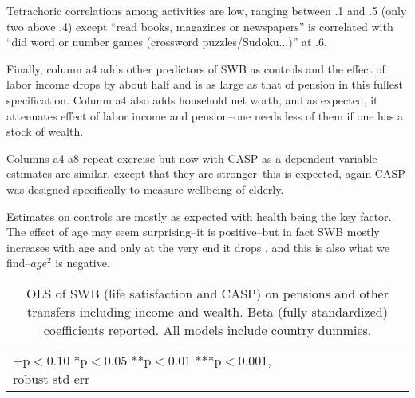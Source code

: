 \documentclass[10pt, letterpaper]{article}
\begin{document}
\begin{spacing}{1.4}
Tetrachoric correlations among activities are low, ranging between .1 and .5
(only two above .4) except ``read books, magazines or newspapers'' is
correlated with ``did word or number games (crossword puzzles/Sudoku...)'' at .6.

Finally, column a4 adds other predictors of SWB as controls and the effect of labor income drops by
about half
and is as large as that of pension in this fullest specification. Column a4 also adds household net
worth, and as expected, it attenuates effect of labor income and pension--one
needs less of them if one has a stock of wealth. 
%

Columns a4-a8 repeat exercise but now with CASP as a dependent
variable--estimates are similar, except that they are
stronger--this is expected, again CASP was designed specifically
to measure wellbeing of elderly. 

%


Estimates on controls are mostly as expected with health being the key
factor. The effect of age may seem surprising--it is  positive--but in fact SWB mostly
increases with age and only at the very end it drops \citep{gwozdz10}, and this
is also what we find--$age^2$ is negative.


\begin{spacing}{.9}
\begin{table}[H]\centering \caption{OLS of SWB (life satisfaction and CASP) on pensions and
    other transfers including income and wealth. Beta (fully standardized)
    coefficients reported. All models
    include country dummies.}  \begin{scriptsize} \begin{tabular}{p{1.8in}p{.5in}p{.5in}p{.5in}p{.5in}|p{.5in}p{.5in}p{.5in}p{.5in}p{.5in}p{.4in}p{.5in}p{.4in}}\hline 
      \hline\multicolumn{5}{l}{+p$<$0.10 *p$<$0.05 **p$<$0.01 ***p$<$0.001,
        robust std err} \end{tabular}\label{regA} \end{scriptsize}\end{table}
\end{spacing}



\end{spacing}
\end{document}
